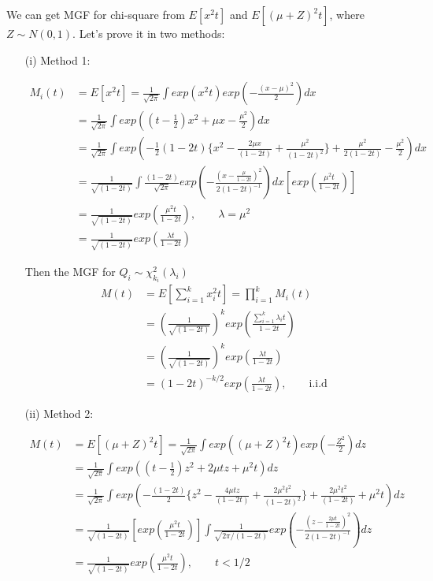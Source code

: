 We can get MGF for chi-square from $E[x^2 t]$ and $E[(\mu + Z)^2 t]$, where $Z \sim N(0,1)$.
Let's prove it in two methods:
\begin{itemize}
	\item [(i)] Method 1:
	
	\begin{align*}
		M_i(t) &= E[x^2 t] = \frac{1}{\sqrt{2\pi}} \int exp(x^2 t) exp \left( - \frac{(x-\mu)^2}{2} \right) dx\\
		&=  \frac{1}{\sqrt{2\pi}}  \int exp \left( (t- \frac{1}{2}) x^2 + \mu x -\frac{\mu^2}{2} \right) dx \\
		&=  \frac{1}{\sqrt{2\pi}}  \int exp \left(  -\frac{1}{2}(1-2t) \{ x^2 - \frac{2 \mu x}{(1-2t)} + \frac{\mu^2}{(1-2t)^2} \} + \frac{\mu^2}{2(1-2t)} -\frac{\mu^2}{2}  \right) dx \\
		&= \frac{1}{\sqrt{(1-2t)}} \int \frac{(1-2t)}{\sqrt{2\pi}} exp\left( -\frac{(x-\frac{\mu}{1-2t})^2}{2 (1-2t)^{-1}} \right) dx \left[exp \left( \frac{\mu^2 t}{1-2t} \right) \right]\\
		&=\frac{1}{\sqrt{(1-2t)}} exp \left( \frac{\mu^2 t}{1-2t} \right), \qquad \lambda = \mu^2\\
		&=\frac{1}{\sqrt{(1-2t)}} exp \left( \frac{\lambda t}{1-2t} \right)
	\end{align*}
	
	Then the MGF for $Q_i \sim \chi^2 _{k_i}(\lambda_i)$
	\begin{align*}
		M(t) &= E[ \sum_{i=1}^k x_i^2 t] = \prod_{i=1}^k M_i(t) \\
		&=\left(\frac{1}{\sqrt{(1-2t)}} \right)^k exp \left( \frac{ \sum_{i=1}^k \lambda_i t }{1-2t} \right)\\
		&=\left(\frac{1}{\sqrt{(1-2t)}} \right)^k exp \left( \frac{ \lambda t }{1-2t} \right)\\
		&= (1-2t)^{-k/2} exp \left( \frac{ \lambda t }{1-2t} \right), \qquad \text{i.i.d}
	\end{align*}
	
	\item[(ii)] Method 2:
	
	\begin{align*}
	M(t) &= E[(\mu + Z)^2 t] = \frac{1}{\sqrt{2\pi}} \int exp \left((\mu + Z)^2 t \right) exp \left( - \frac{Z^2}{2} \right) dz\\
	&=  \frac{1}{\sqrt{2\pi}}  \int exp \left( (t- \frac{1}{2}) z^2 + 2\mu t z + \mu^2 t \right) dz \\
	&=  \frac{1}{\sqrt{2\pi}}  \int exp \left(  -\frac{(1-2t)}{2} \{ z^2 - \frac{4 \mu t z}{(1-2t)} + \frac{2 \mu^2 t^2}{(1-2t)^2} \} + \frac{2 \mu^2 t^2}{(1-2t)} + \mu^2 t   \right) dz \\
	&= \frac{1}{\sqrt{(1-2t)}} \left[exp \left( \frac{\mu^2 t}{1-2t} \right) \right] \int \frac{1}{\sqrt{2\pi/(1-2t)}} exp\left( -\frac{(z-\frac{2 \mu t}{1-2t})^2}{2 (1-2t)^{-1}} \right) dz \\
	&=\frac{1}{\sqrt{(1-2t)}} exp \left( \frac{\mu^2 t}{1-2t} \right), \qquad t<1/2
\end{align*}


\end{itemize}

